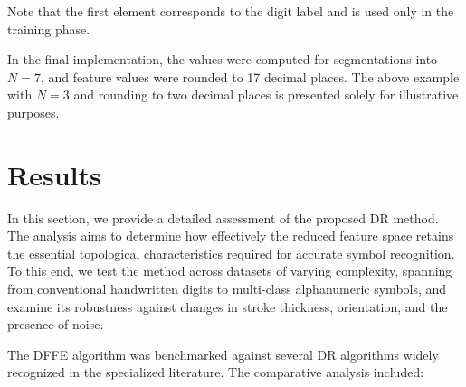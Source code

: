 \documentclass[a4paper,fleqn]{cas-dc}
\begin{document}



Note that the first element corresponds to the digit label and is used only in the training phase.

\begin{rmk}
\normalfont
In the final implementation, the values were computed for segmentations into \(N = 7\), and feature values were rounded to 17 decimal places. The above example with \(N = 3\) and rounding to two decimal places is presented solely for illustrative purposes.
\end{rmk}

\section{Results}\label{sec-results}

In this section, we provide a detailed assessment of the proposed DR method. The analysis aims to determine how effectively the reduced feature space retains the essential topological characteristics required for accurate symbol recognition. To this end, we test the method across datasets of varying complexity, spanning from conventional handwritten digits to multi-class alphanumeric symbols, and examine its robustness against changes in stroke thickness, orientation, and the presence of noise.

The DFFE algorithm was benchmarked against several DR algorithms widely recognized in the specialized literature. The comparative analysis included:
\end{document}
